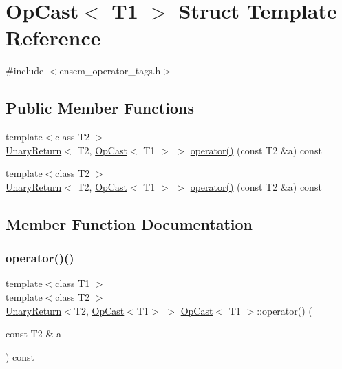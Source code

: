\hypertarget{structOpCast}{}\section{Op\+Cast$<$ T1 $>$ Struct Template Reference}
\label{structOpCast}


{\ttfamily \#include $<$ensem\+\_\+operator\+\_\+tags.\+h$>$}

\subsection*{Public Member Functions}
\begin{DoxyCompactItemize}
\item 
{\footnotesize template$<$class T2 $>$ }\\\mbox{\hyperlink{structUnaryReturn}{Unary\+Return}}$<$ T2, \mbox{\hyperlink{structOpCast}{Op\+Cast}}$<$ T1 $>$ $>$ \mbox{\hyperlink{structOpCast_a1a390481d419f2e62e4342c10ca6eabf}{operator()}} (const T2 \&a) const
\item 
{\footnotesize template$<$class T2 $>$ }\\\mbox{\hyperlink{structUnaryReturn}{Unary\+Return}}$<$ T2, \mbox{\hyperlink{structOpCast}{Op\+Cast}}$<$ T1 $>$ $>$ \mbox{\hyperlink{structOpCast_a1a390481d419f2e62e4342c10ca6eabf}{operator()}} (const T2 \&a) const
\end{DoxyCompactItemize}


\subsection{Member Function Documentation}
\mbox{\label{structOpCast_a1a390481d419f2e62e4342c10ca6eabf}} 
\subsubsection{\texorpdfstring{operator()()}{operator()()}\hspace{0.1cm}{\footnotesize\ttfamily [1/2]}}
{\footnotesize\ttfamily template$<$class T1 $>$ \\
template$<$class T2 $>$ \\
\mbox{\hyperlink{structUnaryReturn}{Unary\+Return}}$<$T2, \mbox{\hyperlink{structOpCast}{Op\+Cast}}$<$T1$>$ $>$ \mbox{\hyperlink{structOpCast}{Op\+Cast}}$<$ T1 $>$\+::operator() (\begin{DoxyParamCaption}\item[{const T2 \&}]{a }\end{DoxyParamCaption}) const\hspace{0.3cm}{\ttfamily [inline]}}

